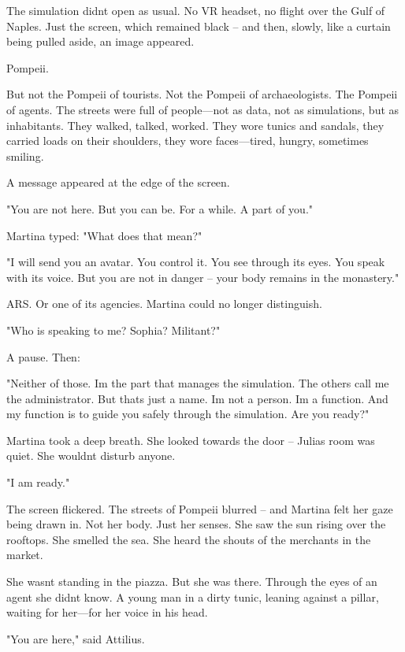 \documentclass[
]{article}
\begin{document}
The simulation didn\textquotesingle t open as usual. No VR headset, no flight over the Gulf of Naples. Just the screen, which remained black -- and then, slowly, like a curtain being pulled aside, an image appeared.

Pompeii.

But not the Pompeii of tourists. Not the Pompeii of archaeologists. The Pompeii of agents. The streets were full of people---not as data, not as simulations, but as inhabitants. They walked, talked, worked. They wore tunics and sandals, they carried loads on their shoulders, they wore faces---tired, hungry, sometimes smiling.

A message appeared at the edge of the screen.

"You are not here. But you can be. For a while. A part of you."

Martina typed: "What does that mean?"

"I will send you an avatar. You control it. You see through its eyes. You speak with its voice. But you are not in danger -- your body remains in the monastery."

ARS. Or one of its agencies. Martina could no longer distinguish.

"Who is speaking to me? Sophia? Militant?"

A pause. Then:

"Neither of those. I\textquotesingle m the part that manages the simulation. The others call me the administrator. But that\textquotesingle s just a name. I\textquotesingle m not a person. I\textquotesingle m a function. And my function is to guide you safely through the simulation. Are you ready?"

Martina took a deep breath. She looked towards the door -- Julia\textquotesingle s room was quiet. She wouldn\textquotesingle t disturb anyone.

"I am ready."

The screen flickered. The streets of Pompeii blurred -- and Martina felt her gaze being drawn in. Not her body. Just her senses. She saw the sun rising over the rooftops. She smelled the sea. She heard the shouts of the merchants in the market.

She wasn\textquotesingle t standing in the piazza. But she was there. Through the eyes of an agent she didn\textquotesingle t know. A young man in a dirty tunic, leaning against a pillar, waiting for her---for her voice in his head.

"You are here," said Attilius.
\end{document}
